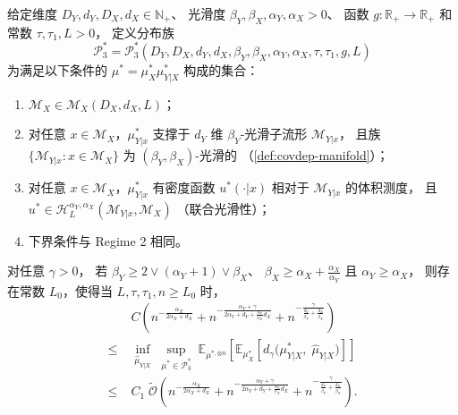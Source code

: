 \begin{Definition}\label{def:regime3b}
    给定维度 $D_Y, d_Y, D_X, d_X \in \mathbb{N}_+$、
    光滑度 $\beta_Y, \beta_X, \alpha_Y, \alpha_X > 0$、
    函数 $g: \mathbb{R}_+ \to \mathbb{R}_+$ 和常数 $\tau, \tau_1, L > 0$，
    定义分布族
    \[
        \mathcal{P}_3^* = \mathcal{P}_3^*(D_Y, D_X, d_Y, d_X,
            \beta_Y, \beta_X, \alpha_Y, \alpha_X, \tau, \tau_1, g, L)
    \]
    为满足以下条件的 $\mu^* = \mu^*_X\mu^*_{Y|X}$ 构成的集合：
    \begin{enumerate}
        \item $\mathcal{M}_X \in \mathcal{M}_X(D_X, d_X, L)$；
        \item 对任意 $x \in \mathcal{M}_X$，$\mu^*_{Y|x}$ 支撑于
              $d_Y$ 维 $\beta_Y$-光滑子流形 $\mathcal{M}_{Y|x}$，
              且族 $\{\mathcal{M}_{Y|x} : x \in \mathcal{M}_X\}$ 为
              $(\beta_Y, \beta_X)$-光滑的
              （\cref{def:covdep-manifold}）；
        \item 对任意 $x \in \mathcal{M}_X$，$\mu^*_{Y|x}$ 有密度函数
              $u^*(\cdot|x)$ 相对于 $\mathcal{M}_{Y|x}$ 的体积测度，
              且 $u^* \in \mathcal{H}_L^{\alpha_Y, \alpha_X}
                 (\mathcal{M}_{Y|x}, \mathcal{M}_X)$
              （联合光滑性）；
        \item 下界条件与 Regime 2 相同。
    \end{enumerate}
\end{Definition}

\begin{Theorem}\label{def:thm-regime3b}
    对任意 $\gamma > 0$，
    若 $\beta_Y \geq 2 \vee (\alpha_Y + 1) \vee \beta_X$、
    $\beta_X \geq \alpha_X + \frac{\alpha_X}{\alpha_Y}$ 且 $\alpha_Y \geq \alpha_X$，
    则存在常数 $L_0$，使得当 $L, \tau, \tau_1, n \geq L_0$ 时，
    \begin{equation}\label{eq:regime3b-minimax}
        \begin{aligned}
            & C\!\left(
                n^{-\frac{\alpha_X}{2\alpha_X + d_X}}
                + n^{-\frac{\alpha_Y + \gamma}{2\alpha_Y + d_Y + \frac{\alpha_Y}{\alpha_X}d_X}}
                + n^{-\frac{\gamma}{\frac{d_Y}{\beta_Y} + \frac{d_X}{\beta_X}}}
            \right) \\
            \leq\;&
            \inf_{\widehat{\mu}_{Y|X}}\;
            \sup_{\mu^* \in \mathcal{P}_3^*}
            \;
            \mathbb{E}_{\mu^{*,\otimes n}}\!\left[
                \mathbb{E}_{\mu^*_X}\!\left[
                    d_\gamma\!\big(\mu^*_{Y|X},\; \widehat{\mu}_{Y|X}\big)
                \right]
            \right] \\
            \leq\;&
            C_1\;\widetilde{\mathcal{O}}\!\left(
                n^{-\frac{\alpha_X}{2\alpha_X + d_X}}
                + n^{-\frac{\alpha_Y + \gamma}{2\alpha_Y + d_Y + \frac{\alpha_Y}{\alpha_X}d_X}}
                + n^{-\frac{\gamma}{\frac{d_Y}{\beta_Y} + \frac{d_X}{\beta_X}}}
            \right).
        \end{aligned}
    \end{equation}
\end{Theorem}

